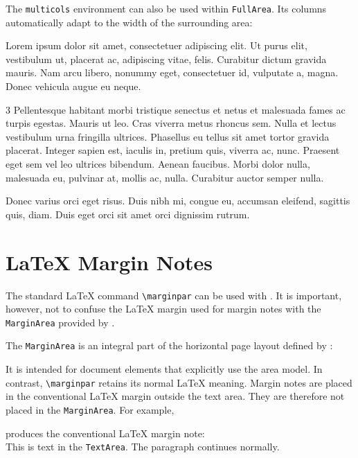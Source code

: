\documentclass[
11pt,
a4paper,
oneside
]{scrbook}
\begin{document}
\noindent The \texttt{multicols} environment can also be used within
\texttt{FullArea}. Its columns automatically adapt to the width of
the surrounding area:




\begin{FullArea}
	Lorem ipsum dolor sit amet, consectetuer adipiscing elit. Ut purus elit, vestibulum ut, placerat ac, adipiscing vitae, felis. Curabitur dictum gravida mauris. Nam arcu libero, nonummy eget, consectetuer id, vulputate a, magna. Donec vehicula augue eu neque.
	\begin{multicols}{3}
		Pellentesque habitant morbi tristique senectus et netus et malesuada fames ac turpis egestas. Mauris ut leo. Cras viverra metus rhoncus sem. Nulla et lectus vestibulum urna fringilla ultrices. Phasellus eu tellus sit amet tortor gravida placerat. Integer sapien est, iaculis in, pretium quis, viverra ac, nunc. Praesent eget sem vel leo ultrices bibendum. Aenean faucibus. Morbi dolor nulla, malesuada eu, pulvinar at, mollis ac, nulla. Curabitur auctor semper nulla.
	\end{multicols}
	Donec varius orci eget risus. Duis nibh mi, congue eu, accumsan eleifend, sagittis quis, diam. Duis eget orci sit amet orci dignissim rutrum.
\end{FullArea}


\section{\LaTeX{} Margin Notes}

The standard \LaTeX{} command \texttt{\textbackslash{}marginpar} can be used
with \MDWordmark. It is important, however, not to confuse the
\LaTeX{} margin used for margin notes with the \texttt{MarginArea}
provided by \MDWordmark.

The \texttt{MarginArea} is an integral part of the horizontal page
layout defined by \MDWordmark:




It is intended for document elements that explicitly use the
\MDWordmark area model.
In contrast, \texttt{\textbackslash{}marginpar} retains its normal \LaTeX{}
meaning. Margin notes are placed in the conventional \LaTeX{} margin
outside the text area. They are therefore not placed in the
\MDWordmark \texttt{MarginArea}.
For example,




produces the conventional \LaTeX{} margin note:\\[1ex]
This is text in the \texttt{TextArea}.
The paragraph continues normally.\\[1ex]
\end{document}
